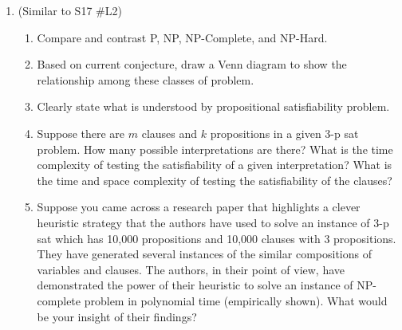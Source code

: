 \begin{enumerate}
	
	\item (Similar to S17 \#L2)
	\begin{enumerate}
		\item Compare and contrast P, NP, NP-Complete, and NP-Hard.
		\item Based on current conjecture, draw a Venn diagram to show the relationship among these classes of problem.
		\item Clearly state what is understood by propositional satisfiability problem. 
		\item Suppose there are $m$ clauses and $k$ propositions in a given 3-p sat problem.  How many possible interpretations are there?  What is the time complexity of testing the satisfiability of a given interpretation?  What is the time and space complexity of testing the satisfiability of the clauses?
		\item Suppose you came across a research paper that highlights a clever heuristic strategy that the authors have used to solve an instance of 3-p sat which has 10,000 propositions and 10,000 clauses with 3 propositions.  They have generated several instances of the similar compositions of variables and clauses.  The authors, in their point of view, have demonstrated the power of their heuristic to solve an instance of NP-complete problem in polynomial time (empirically shown).  What would be your insight of their findings?
	\end{enumerate}
	


\end{enumerate}
